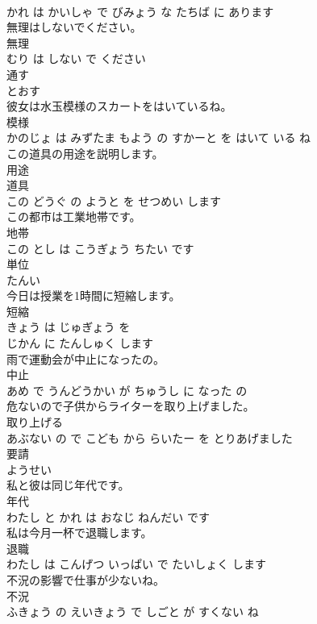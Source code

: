 \documentclass[8pt]{extreport}
\begin{document}
\begin{CJK}{UTF8}{min}
\\	かれ は かいしゃ で びみょう な たちば に あります			
\\	無理はしないでください。	
\\	無理 
\\	むり は しない で ください			
\\	通す	
\\	とおす			
\\	彼女は水玉模様のスカートをはいているね。	
\\	模様 
\\	かのじょ は みずたま もよう の すかーと を はいて いる ね			
\\	この道具の用途を説明します。	
\\	用途 
\\	道具 
\\	この どうぐ の ようと を せつめい します			
\\	この都市は工業地帯です。	
\\	地帯 
\\	この とし は こうぎょう ちたい です			
\\	単位	
\\	たんい			
\\	今日は授業を1時間に短縮します。	
\\	短縮 
\\	きょう は じゅぎょう を 
\\	じかん に たんしゅく します			
\\	雨で運動会が中止になったの。	
\\	中止 
\\	あめ で うんどうかい が ちゅうし に なった の			
\\	危ないので子供からライターを取り上げました。	
\\	取り上げる 
\\	あぶない の で こども から らいたー を とりあげました			
\\	要請	
\\	ようせい			
\\	私と彼は同じ年代です。	
\\	年代 
\\	わたし と かれ は おなじ ねんだい です			
\\	私は今月一杯で退職します。	
\\	退職 
\\	わたし は こんげつ いっぱい で たいしょく します			
\\	不況の影響で仕事が少ないね。	
\\	不況 
\\	ふきょう の えいきょう で しごと が すくない ね			

\end{CJK}
\end{document}
